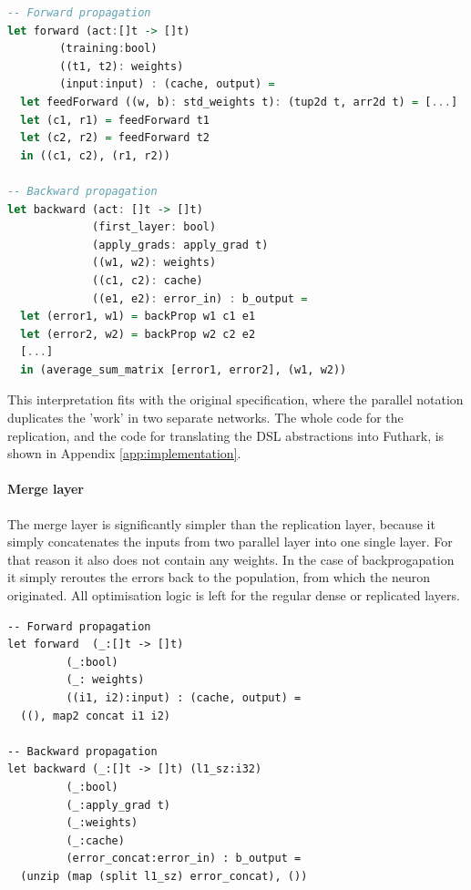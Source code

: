 \begin{lstlisting}[language=Haskell,label={code:bp-replicate},caption={Part
    of the forward and backward propagation algorithms for the replicate layer.
Abbreviated for clarity.}]
-- Forward propagation
let forward (act:[]t -> []t)
	    (training:bool)
	    ((t1, t2): weights)
	    (input:input) : (cache, output) =
  let feedForward ((w, b): std_weights t): (tup2d t, arr2d t) = [...]
  let (c1, r1) = feedForward t1
  let (c2, r2) = feedForward t2
  in ((c1, c2), (r1, r2))

-- Backward propagation
let backward (act: []t -> []t)
             (first_layer: bool)
             (apply_grads: apply_grad t)
             ((w1, w2): weights)
             ((c1, c2): cache)
             ((e1, e2): error_in) : b_output =
  let (error1, w1) = backProp w1 c1 e1
  let (error2, w2) = backProp w2 c2 e2
  [...]
  in (average_sum_matrix [error1, error2], (w1, w2))
\end{lstlisting}

This interpretation fits with the original specification, where
the parallel notation duplicates the 'work' in two separate networks.
The whole code for the replication, and the code for translating the \gls{DSL}
abstractions into Futhark, is shown in Appendix 
\ref{app:implementation}.

\paragraph{Merge layer}
The merge layer is significantly simpler than the replication layer,
because it simply concatenates the inputs from two parallel layer into one single
layer. 
For that reason it also does not contain any weights.
In the case of backprogapation it simply reroutes the errors back to
the population, from which the neuron originated.
All optimisation logic is left for the regular dense or replicated
layers.

\begin{lstlisting}[caption={Functions for forward and backward propagation in
the merge layer.}]
-- Forward propagation
let forward  (_:[]t -> []t)
	     (_:bool)
	     (_: weights)
	     ((i1, i2):input) : (cache, output) =
  ((), map2 concat i1 i2)

-- Backward propagation
let backward (_:[]t -> []t) (l1_sz:i32)
	     (_:bool)
	     (_:apply_grad t)
	     (_:weights)
	     (_:cache)
	     (error_concat:error_in) : b_output =
  (unzip (map (split l1_sz) error_concat), ())
\end{lstlisting}

